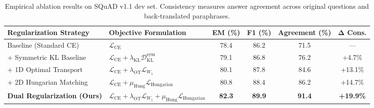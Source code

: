 \begin{table}[t]
\centering
\small
\begin{tabular}{llcccc}
\toprule
\textbf{Regularization Strategy} & \textbf{Objective Formulation} & \textbf{EM (\%)} & \textbf{F1 (\%)} & \textbf{Agreement (\%)} & $\mathbf{\Delta}$ \textbf{Cons.} \\
\midrule
Baseline (Standard CE) & $\mathcal{L}_{\text{CE}}$ & 78.4 & 86.2 & 71.5 & --- \\
+ Symmetric KL Baseline & $\mathcal{L}_{\text{CE}} + \lambda_{\text{KL}}\mathcal{D}_{\text{KL}}^{\text{sym}}$ & 79.1 & 86.8 & 76.2 & +4.7\% \\
+ 1D Optimal Transport & $\mathcal{L}_{\text{CE}} + \lambda_{\text{OT}}\mathcal{L}_{W_1}$ & 80.1 & 87.8 & 84.6 & +13.1\% \\
+ 2D Hungarian Matching & $\mathcal{L}_{\text{CE}} + \mu_{\text{Hung}}\mathcal{L}_{\text{Hungarian}}$ & 80.8 & 88.4 & 86.2 & +14.7\% \\
\textbf{Dual Regularization (Ours)} & $\mathcal{L}_{\text{CE}} + \lambda_{\text{OT}}\mathcal{L}_{W_1} + \mu_{\text{Hung}}\mathcal{L}_{\text{Hungarian}}$ & \textbf{82.3} & \textbf{89.9} & \textbf{91.4} & \textbf{+19.9\%} \\
\bottomrule
\end{tabular}
\caption{Empirical ablation results on SQuAD v1.1 dev set. Consistency measures answer agreement across original questions and back-translated paraphrases.}
\label{tab:ablation_results}
\end{table}
